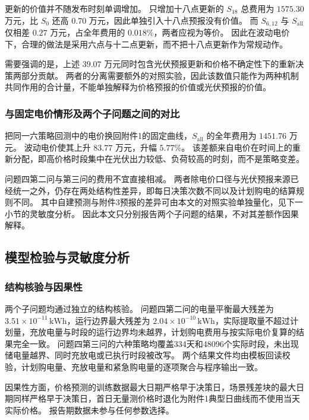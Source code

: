 更新的价值并不随发布时刻单调增加。
只增加十八点更新的 \(S_{18}\) 总费用为 \(1575.30\) 万元，比 \(S_0\) 还高 \(0.70\) 万元，因此单独引入十八点预报没有价值。
而 \(S_{6,12}\) 与 \(S_{\mathrm{all}}\) 仅相差 \(0.27\) 万元，占全年费用的 \(0.018\%\)，两者应视为等价。
因此在波动电价下，合理的做法是采用六点与十二点更新，而不把十八点更新作为常规动作。

需要强调的是，上述 \(39.07\) 万元同时包含光伏预报更新和价格不确定性下的重新决策两部分贡献。
两者的分离需要额外的对照实验，因此该数值只能作为两种机制共同作用的合计量，不能单独解释为价格预报的价值或光伏预报的价值。

\subsubsection{与固定电价情形及两个子问题之间的对比}

把同一六策略回测中的电价换回附件1的固定曲线，\(S_{\mathrm{all}}\) 的全年费用为 \(1451.76\) 万元。
波动电价使其上升 \(83.77\) 万元，升幅 \(5.77\%\)。
该差额来自电价在时间上的重新分配，即高价格时段集中在光伏出力较低、负荷较高的时刻，而不是策略变差。

问题四第二问与第三问的费用不宜直接相减。
两者除电价口径与光伏预报来源已经统一之外，仍存在两处结构性差异，即每日决策次数不同以及计划购电的结算规则不同。
其中自建预测与附件3预报的差异可由本文的对照实验单独量化，见下一小节的灵敏度分析。
因此本文只分别报告两个子问题的结果，不对其差额作因果解释。

\subsection{模型检验与灵敏度分析}

\subsubsection{结构核验与因果性}

两个子问题均通过独立的结构核验。
问题四第二问的电量平衡最大残差为 \(3.51\times10^{-11}\,\mathrm{kWh}\)，运行边界最大残差为 \(2.04\times10^{-10}\,\mathrm{kWh}\)，实际提取量不超过计划量，充放电量与时段的运行边界均未越界，计划购电费用与按实际电价复算的结果完全一致。
问题四第三问的六种策略均覆盖334天和48096个实际时段，未出现储电量越界、同时充放电或已执行时段被改写。
两个结果文件均由模板回读校验，计划购电量、充放电量和紧急购电量的逐项聚合与程序输出一致。

因果性方面，价格预测的训练数据最大日期严格早于决策日，场景残差块的最大日期同样严格早于决策日，首日无量测价格时退化为附件1典型日曲线而不使用当天实际价格。
报告期数据未参与任何参数选择。

